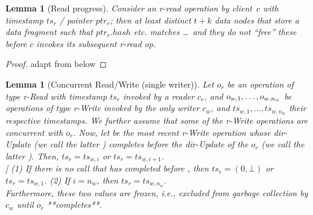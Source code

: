 \documentclass[oribibl]{llncs}
\newtheorem{lemma}[theorem]{Lemma}
\theoremstyle{definition-boldhead}
\newcommand{\var}[1]{\textit{#1}}
\newcommand{\op}[1]{\textsl{#1}}
\newcommand{\dir}{\var{dir}\xspace}
\newcommand{\nodes}{nodes\xspace}
\providecommand{\note}[1]{}
\renewcommand{\note}[1]{[[\textsf{\bf #1}]]}
\begin{document}

\begin{lemma}[Read progress]
  Consider an r-read operation by client~$c$ with timestamp $ts_r$ /
  pointer $ptr_r$; then at least distinct $t+k$ data \nodes that
  store a data fragment such that $ptr_r.hash$ etc. matches \dots\ and
  they do not ``free'' these before $c$ invokes its subsequent r-read
  op.
\end{lemma}

\begin{proof}
  adapt from below
\end{proof}


\begin{lemma}[Concurrent Read/Write (single writer)]
\label{lem:concwr}
Let $o_r$ be an operation of type \var{r}-\op{Read} with timestamp $\var{ts}_r$
invoked by a reader $c_r$, and $o_{w,1}, \ldots, o_{w,n_w}$ be operations
of type \var{r}-\op{Write} invoked by the only writer $c_w$,
and $\var{ts}_{w,1}, \ldots, \var{ts}_{w,n_w}$ their respective timestamps.
We further assume that some of the \var{r}-\op{Write} operations are
concurrent with $o_r$. Now, let  be the most recent
\var{r}-\op{Write} operation
whose \dir-\op{Update} (we call the latter ) completes before the
\dir-\op{Update} of the $o_r$ (we call the latter \updaterd).
Then, $\var{ts}_r = \var{ts}_{w,i}$ or $\var{ts}_r = \var{ts}_{w,i+1}$. \\
\note{Corner cases:} (1) If there is no  call that has completed
before \updaterd, then $\var{ts}_r = (0, \bot)$ or $\var{ts}_r = \var{ts}_{w, 1}$.
(2) If $i=n_w$, then $\var{ts}_r = \var{ts}_{w, n_w}$.\\
Furthermore, these two values are \emph{frozen}, i.e., excluded from garbage
collection by $c_w$ until $o_r${} **completes**.

\end{lemma}
\end{document}
